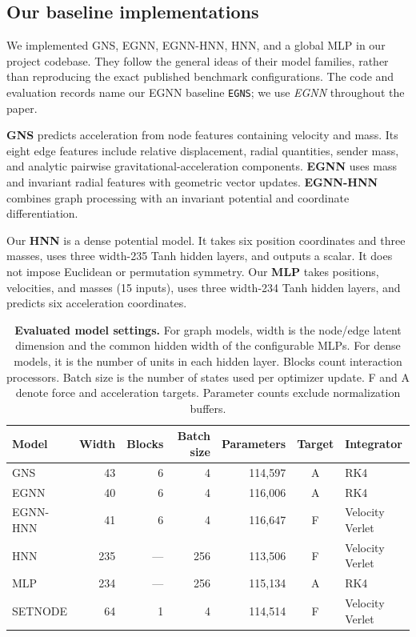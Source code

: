 \documentclass[10pt,letterpaper,twocolumn]{article}
\numberwithin{equation}{section}
\begin{document}
\subsection{Our baseline implementations}

We implemented GNS, EGNN, EGNN-HNN, HNN, and a global MLP in our project codebase. They follow
the general ideas of their model families, rather than reproducing the exact published benchmark
configurations. The code and evaluation records name our EGNN baseline \texttt{EGNS}; we use
\emph{EGNN} throughout the paper.

\textbf{GNS} predicts acceleration from node features containing velocity and mass. Its eight edge
features include relative displacement, radial quantities, sender mass, and analytic pairwise
gravitational-acceleration components. \textbf{EGNN} uses mass and invariant radial features with
geometric vector updates. \textbf{EGNN-HNN} combines graph processing with an invariant potential
and coordinate differentiation.

Our \textbf{HNN} is a dense potential model. It takes six position coordinates and three masses,
uses three width-235 Tanh hidden layers, and outputs a scalar. It does not impose Euclidean or
permutation symmetry. Our \textbf{MLP} takes positions, velocities, and masses (15 inputs), uses
three width-234 Tanh hidden layers, and predicts six acceleration coordinates.

\begin{table}[t]
\centering\small
\caption{\textbf{Evaluated model settings.} For graph models, width is the node/edge latent dimension
and the common hidden width of the configurable MLPs. For dense models, it is the number of units
in each hidden layer. Blocks count interaction processors. Batch size is the
number of states used per optimizer update. F and A denote force and acceleration targets.
Parameter counts exclude normalization buffers.}
\label{tab:models}
\setlength{\tabcolsep}{9pt}
\begin{tabular}{lrrrrcl}
\toprule
Model & Width & Blocks & Batch size & Parameters & Target & Integrator\\
\midrule
GNS & 43 & 6 & 4 & 114,597 & A & RK4\\
EGNN & 40 & 6 & 4 & 116,006 & A & RK4\\
EGNN-HNN & 41 & 6 & 4 & 116,647 & F & Velocity Verlet\\
HNN & 235 & --- & 256 & 113,506 & F & Velocity Verlet\\
MLP & 234 & --- & 256 & 115,134 & A & RK4\\
SETNODE & 64 & 1 & 4 & 114,514 & F & Velocity Verlet\\
\bottomrule
\end{tabular}
\end{table}
\end{document}
